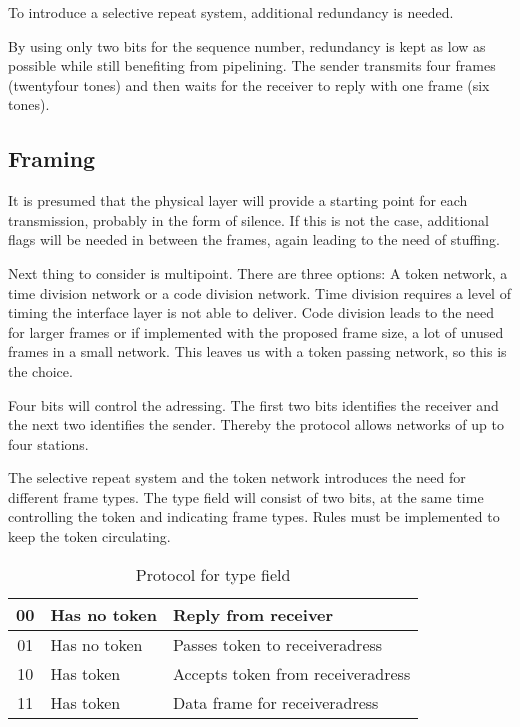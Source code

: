 \documentclass[letterpaper]{article}
\begin{document}
To introduce a selective repeat system, additional redundancy is needed.

By using only two bits for the sequence number, redundancy is kept as low as
possible while still benefiting from pipelining. The sender transmits four
frames (twentyfour tones) and then waits for the receiver to reply with one frame (six
tones).

\subsection{Framing}
It is presumed that the physical layer will provide a starting point for each
transmission, probably in the form of silence. If this is not the case,
additional flags will be needed in between the frames, again leading to the need
of stuffing.

Next thing to consider is multipoint. There are three options: A token
network, a time division network or a code division network. Time division
requires a level of timing the interface layer is not able to deliver.
Code division leads to the need for larger frames or if implemented with the
proposed frame size, a lot of unused frames in a small network. This leaves us
with a token passing network, so this is the choice.

Four bits will control the adressing. The first two
bits identifies the receiver and the next two identifies the sender. Thereby the
protocol allows networks of up to four stations.

The selective repeat system and the token network introduces the need for different frame types.
The type field will consist of two bits, at the same time controlling
the token and indicating frame types. Rules must be implemented to keep the token circulating.

\begin{table}[htb]
	\begin{center}
	\begin{tabular}{|c|ll|}
		\hline
		00 & Has no token & Reply from receiver \\
		\hline
		01 & Has no token & Passes token to receiveradress \\
		\hline
		10 & Has token & Accepts token from receiveradress \\
		\hline
		11 & Has token & Data frame for receiveradress \\
		\hline
	\end{tabular}
	\end{center}
	\caption{Protocol for type field}
	\label{tab:Protocol for type field}
\end{table}
\end{document}
